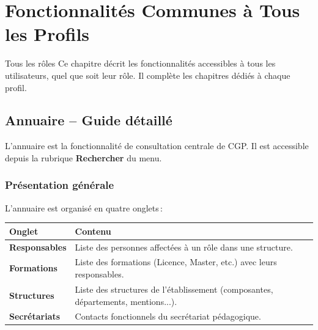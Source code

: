 \chapter{Fonctionnalit\'es Communes \`a Tous les Profils}
\label{chap:commun}

\begin{rolebox}{Tous les r\^oles}
  Ce chapitre d\'ecrit les fonctionnalit\'es accessibles \`a tous les utilisateurs, quel que soit leur r\^ole. Il compl\`ete les chapitres d\'edi\'es \`a chaque profil.
\end{rolebox}

\section{Annuaire -- Guide d\'etaill\'e}
\label{sec:annuaire}

L'annuaire est la fonctionnalit\'e de consultation centrale de CGP. Il est accessible depuis la rubrique \textbf{Rechercher} du menu.

\subsection{Pr\'esentation g\'en\'erale}

L'annuaire est organis\'e en quatre onglets\,:

\medskip
\begin{tabularx}{\textwidth}{L{3cm}X}
  \toprule
  \textbf{Onglet} & \textbf{Contenu} \\
  \midrule
  \textbf{Responsables} & Liste des personnes affect\'ees \`a un r\^ole dans une structure. \\
  \textbf{Formations} & Liste des formations (Licence, Master, etc.) avec leurs responsables. \\
  \textbf{Structures} & Liste des structures de l'\'etablissement (composantes, d\'epartements, mentions...). \\
  \textbf{Secr\'etariats} & Contacts fonctionnels du secr\'etariat p\'edagogique. \\
  \bottomrule
\end{tabularx}


